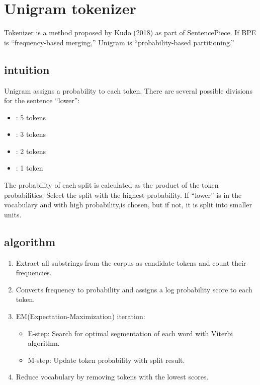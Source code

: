 \section{Unigram tokenizer}

Tokenizer is a method proposed by Kudo (2018) as part of SentencePiece. If BPE is ``frequency-based merging,'' Unigram is ``probability-based partitioning.''

\subsection{intuition}

Unigram assigns a probability to each token. There are several possible divisions for the sentence ``lower'':
\begin{itemize}
\item\code{[l, o, w, e, r]}: 5 tokens
\item\code{[lo, w, er]}: 3 tokens
\item\code{[low, er]}: 2 tokens
\item\code{[lower]}: 1 token
\end{itemize}

The probability of each split is calculated as the product of the token probabilities. Select the split with the highest probability. If ``lower'' is in the vocabulary and with high probability,\code{[lower]}is chosen, but if not, it is split into smaller units.

\subsection{algorithm}

\begin{enumerate}
\item Extract all substrings from the corpus as candidate tokens and count their frequencies.
\item Converts frequency to probability and assigns a log probability score to each token.
\item EM(Expectation-Maximization) iteration:
    \begin{itemize}
\item E-step: Search for optimal segmentation of each word with Viterbi algorithm.
\item M-step: Update token probability with split result.
    \end{itemize}
\item Reduce vocabulary by removing tokens with the lowest scores.
\end{enumerate}

